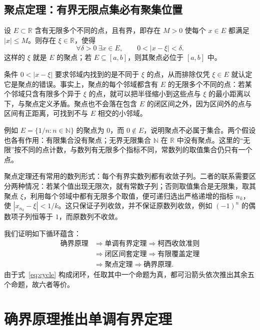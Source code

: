 \documentclass[UTF8,12pt,a4paper,fontset=fandol]{ctexart}
\begin{document}
\subsection{聚点定理：有界无限点集必有聚集位置}

\begin{theorem}[聚点定理]
  \label{thm:accumulation}
  设 $E\subset\mathbb R$ 含有无限多个不同的点，且有界，即存在 $M>0$ 使每个 $x\in E$ 都满足 $|x|\leq M$。则存在 $\xi\in\mathbb R$，使得
  \[
    \forall\delta>0\ \exists x\in E,
    \qquad 0<|x-\xi|<\delta.
  \]
  这样的 $\xi$ 就是 $E$ 的聚点；若 $E\subseteq[a,b]$，则其聚点必位于 $[a,b]$ 中。
\end{theorem}

条件 $0<|x-\xi|$ 要求邻域内找到的是不同于 $\xi$ 的点，从而排除仅凭 $\xi\in E$ 就认定它是聚点的错误。事实上，聚点的每个邻域都含有 $E$ 的无限多个不同的点：若某个邻域只含有限多个异于 $\xi$ 的点，就可以把半径缩小到这些点与 $\xi$ 的最小距离以下，与聚点定义矛盾。聚点也不会落在包含 $E$ 的闭区间之外，因为区间外的点与区间有正距离，可找到不与 $E$ 相交的小邻域。

例如 $E=\{1/n:n\in\mathbb N\}$ 的聚点为 $0$，而 $0\notin E$，说明聚点不必属于集合。两个假设也各有作用：有限集合没有聚点；无界无限集合 $\mathbb N$ 在 $\mathbb R$ 中没有聚点。这里的“无限”按不同的点计数，与数列有无限多个指标不同，常数列的取值集合仍只有一个点。

聚点定理还有常用的数列形式：每个有界实数列都有收敛子列。二者的联系需要区分两种情况：若某个值出现无限次，就有常数子列；否则取值集合是无限集，取其聚点 $\xi$，利用每个邻域中都有无限多个取值，便可递归选出严格递增的指标 $n_k$，使 $|x_{n_k}-\xi|<1/k$。这只保证子列收敛，并不保证原数列收敛，例如 $(-1)^n$ 的偶数项子列恒等于 $1$，而原数列不收敛。

我们证明如下循环蕴含：
\begin{equation}
  \begin{aligned}
    \text{确界原理}
    &\Longrightarrow \text{单调有界定理}
    \Longrightarrow \text{柯西收敛准则} \\
    &\Longrightarrow \text{闭区间套定理}
    \Longrightarrow \text{有限覆盖定理} \\
    &\Longrightarrow \text{聚点定理}
    \Longrightarrow \text{确界原理}.
  \end{aligned}
  \label{eq:cycle}
\end{equation}
由于式~\eqref{eq:cycle} 构成闭环，任取其中一个命题为真，都可沿箭头依次推出其余五个命题，故六者等价。

\section{确界原理推出单调有界定理}
\end{document}
